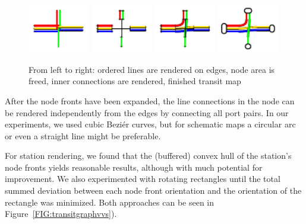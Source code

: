 \documentclass{llncs}
\begin{document}
\begin{figure}[t]
  \centering
	\includegraphics[width=0.24\textwidth]{render_examples/rendering/render_example1.pdf}
	\hfill
    \includegraphics[width=0.24\textwidth]{render_examples/rendering/render_example2.pdf}
    \hfill
    \includegraphics[width=0.24\textwidth]{render_examples/rendering/render_example3.pdf}
    \hfill
    \includegraphics[width=0.24\textwidth]{render_examples/rendering/render_example4.pdf}
	\caption{From left to right: ordered lines are rendered on edges, node area is freed, inner connections are rendered, finished transit map}
	\label{FIG:renderingproc}
\end{figure}

After the node fronts have been expanded, the line connections in the node can be rendered independently from the edges by connecting all port pairs. In our experiments, we used cubic Bezi\'{e}r curves, but for schematic maps a circular arc or even a straight line might be preferable.

For station rendering, we found that the (buffered) convex hull of the station's node fronts yields reasonable results, although with much potential for improvement. We also experimented with rotating rectangles until the total summed deviation between each node front orientation and the orientation of the rectangle was minimized. Both approaches can be seen in Figure~\ref{FIG:transitgraphvvs}).
\end{document}
